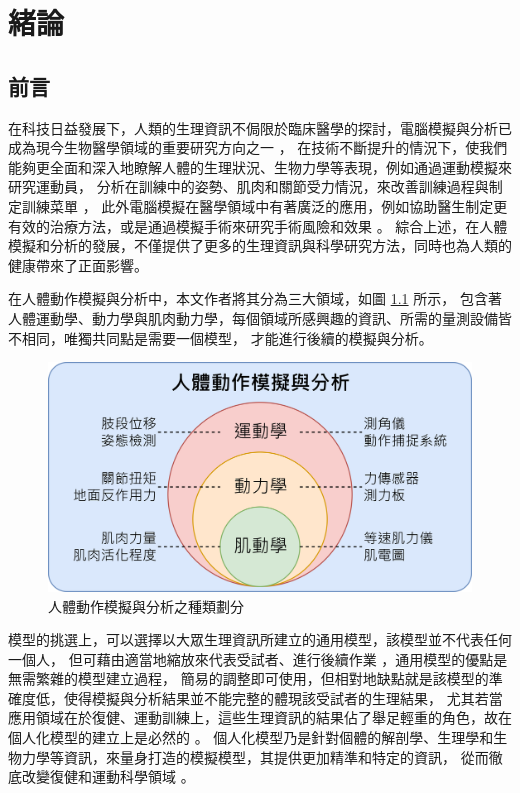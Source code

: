 \chapter{緒論}
\fontsize{12pt}{18pt}\selectfont

\section{前言}
在科技日益發展下，人類的生理資訊不侷限於臨床醫學的探討，電腦模擬與分析已成為現今生物醫學領域的重要研究方向之一 \cite{roupa2022modeling} \cite{uhlrich2023ten}，
在技術不斷提升的情況下，使我們能夠更全面和深入地瞭解人體的生理狀況、生物力學等表現，例如通過運動模擬來研究運動員，
分析在訓練中的姿勢、肌肉和關節受力情況，來改善訓練過程與制定訓練菜單 \cite{barnamehei2020muscle} \cite{bullock2022just}，
此外電腦模擬在醫學領域中有著廣泛的應用，例如協助醫生制定更有效的治療方法，或是通過模擬手術來研究手術風險和效果 \cite{delp1990interactive} \cite{rajagopal2020pre}。
綜合上述，在人體模擬和分析的發展，不僅提供了更多的生理資訊與科學研究方法，同時也為人類的健康帶來了正面影響。

在人體動作模擬與分析中，本文作者將其分為三大領域，如圖 \ref{ch1_fig_StudyBackground} 所示，
包含著人體運動學、動力學與肌肉動力學，每個領域所感興趣的資訊、所需的量測設備皆不相同，唯獨共同點是需要一個模型，
才能進行後續的模擬與分析。

\begin{figure}[!ht]
	\centering
	\includegraphics[width=12cm]{figure/ch1_fig_StudyBackground.png}
    \caption[人體動作模擬與分析之種類劃分]{人體動作模擬與分析之種類劃分}
    \label{ch1_fig_StudyBackground}
\end{figure}

模型的挑選上，可以選擇以大眾生理資訊所建立的通用模型，該模型並不代表任何一個人，
但可藉由適當地縮放來代表受試者、進行後續作業 \cite{winby2008evaluation}，通用模型的優點是無需繁雜的模型建立過程，
簡易的調整即可使用，但相對地缺點就是該模型的準確度低，使得模擬與分析結果並不能完整的體現該受試者的生理結果，
尤其若當應用領域在於復健、運動訓練上，這些生理資訊的結果佔了舉足輕重的角色，故在個人化模型的建立上是必然的 \cite{akhundov2022subject}。
個人化模型乃是針對個體的解剖學、生理學和生物力學等資訊，來量身打造的模擬模型，其提供更加精準和特定的資訊，
從而徹底改變復健和運動科學領域 \cite{pizzolato2017bioinspired}。 

